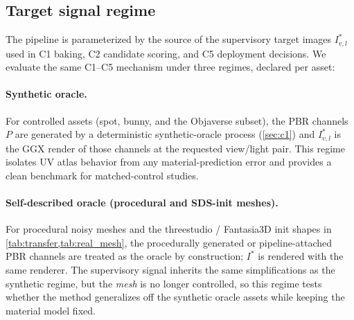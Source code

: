 
\subsection{Target signal regime}
\label{sec:target_regime}

The pipeline is parameterized by the source of the supervisory target images
\(I^*_{v,l}\) used in C1 baking, C2 candidate scoring, and C5 deployment
decisions. We evaluate the same C1--C5 mechanism under three regimes,
declared per asset:

\paragraph*{Synthetic oracle.}
For controlled assets (spot, bunny, and the Objaverse subset), the PBR
channels \(P\) are generated by a deterministic synthetic-oracle process
(\cref{sec:c1}) and \(I^*_{v,l}\) is the GGX render of those channels at
the requested view/light pair. This regime isolates UV atlas behavior
from any material-prediction error and provides a clean benchmark for
matched-control studies.

\paragraph*{Self-described oracle (procedural and SDS-init meshes).}
For procedural noisy meshes and the threestudio / Fantasia3D init shapes
in \cref{tab:transfer,tab:real_mesh}, the procedurally generated or
pipeline-attached PBR channels are treated as the oracle by construction;
\(I^*\) is rendered with the same renderer. The supervisory signal
inherits the same simplifications as the synthetic regime, but the
\emph{mesh} is no longer controlled, so this regime tests whether the
method generalizes off the synthetic oracle assets while keeping the
material model fixed.

